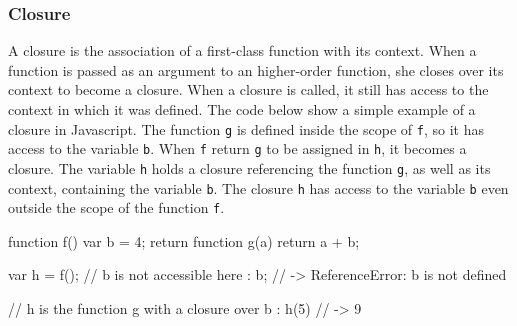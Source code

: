 \subsubsection{Closure}


A closure is the association of a first-class function with its context.
When a function is passed as an argument to an higher-order function, she closes over its context to become a closure.
When a closure is called, it still has access to the context in which it was defined.
The code below show a simple example of a closure in Javascript.
The function \texttt{g} is defined inside the scope of \texttt{f}, so it has access to the variable \texttt{b}.
When \texttt{f} return \texttt{g} to be assigned in \texttt{h}, it becomes a closure.
The variable \texttt{h} holds a closure referencing the function \texttt{g}, as well as its context, containing the variable \texttt{b}.
The closure \texttt{h} has access to the variable \texttt{b} even outside the scope of the function \texttt{f}.

\begin{code}
  function f() {
    var b = 4;
    return function g(a) {
      return a + b;
    }
  }

  var h = f();
  // b is not accessible here :
  b; // -> ReferenceError: b is not defined

  // h is the function g with a closure over b :
  h(5) // -> 9
\end{code}


\endinput

\subsubsection{About closures and an alternative to the fluxionnal execution model}

A closure is a function associated with an environment.
In Javascript it is declared like this :


\begin{code}
function closureCreator(env) {
  return function closure() {
    console.log('my environement is ' + env);
  }
}

closureCreator('dynamically generated')();
\end{code}

The same function can lead to multiple closures.

